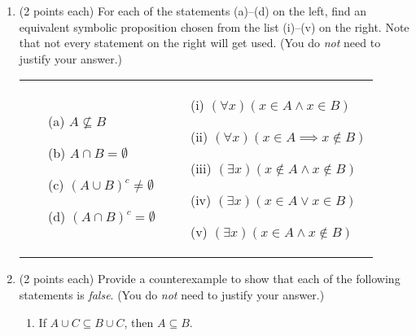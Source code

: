 \documentclass[11pt]{article}
\theoremstyle{definition}
\begin{document}
\begin{enumerate}

\item (2 points each)  For each of the statements (a)--(d) on the left, find an equivalent symbolic proposition chosen from the list (i)--(v) on the right.  Note that not every statement on the right will get used.  (You do \emph{not} need to justify your answer.)

\medskip

\begin{tabular}{@{}ll}
\begin{minipage}[l]{3.25in}
\begin{enumerate}
\item[(a)] $A \nsubseteq B$

\item[(b)] $A \cap B= \emptyset$

\item[(c)] $(A \cup B)^{c} \neq \emptyset$

\item[(d)] $(A \cap B)^{c} = \emptyset$

\end{enumerate}
\end{minipage}
 &
\begin{minipage}[l]{3.25in}
\begin{enumerate}

\item[(i)] $(\forall x)(x \in A \wedge x \in B)$ 

\item[(ii)] $(\forall x)(x \in A \implies x \notin B)$ 

\item[(iii)] $(\exists x)(x \notin A \wedge x \notin B)$

\item[(iv)] $(\exists x)(x \in A \vee x \in B)$

\item[(v)] $(\exists x)(x \in A \wedge x\notin B)$

\end{enumerate}
\end{minipage}
\end{tabular}

\item (2 points each)  Provide a counterexample to show that each of the following statements is \emph{false}.  (You do \emph{not} need to justify your answer.)

\begin{enumerate}
\item If $A \cup C \subseteq B \cup C$, then $A \subseteq B$.


\end{enumerate}
\end{enumerate}
\end{document}
